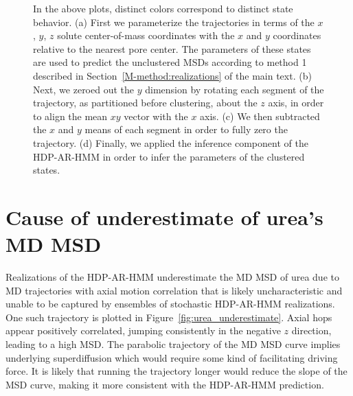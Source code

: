 \documentclass{article}
\begin{document}
\begin{figure}
\begin{subfigure}{0.6\textwidth}
		\caption{}\label{fig:zeroed_clustered_hmm}
	\end{subfigure}  
	\caption{In the above plots, distinct colors correspond to distinct state behavior. 
	(a) First we parameterize the trajectories in terms of the $x$, $y$, $z$ solute 
	center-of-mass coordinates with the $x$ and $y$ coordinates relative to the nearest 
	pore center. The parameters of these states are used to predict the unclustered MSDs
	according to method 1 described in Section~\ref{M-method:realizations} of the main
	text. (b) Next, we zeroed out the $y$ dimension by rotating each segment of the 
	trajectory, as partitioned before clustering, about the $z$ axis, in order to align the 
  	mean $xy$ vector with the $x$ axis. (c) We then subtracted the $x$ and $y$ means of
  	each segment in order to fully zero the trajectory. (d) Finally, we applied the 
  	inference component of the HDP-AR-HMM in order to infer the parameters of the 
  	clustered states.
	}\label{fig:hmm_demo}
  \end{figure}
  
  \newpage

  \section{Cause of underestimate of urea's MD MSD}\label{section:urea_underestimate}
  
  Realizations of the HDP-AR-HMM underestimate the MD MSD of urea due to MD
  trajectories with axial motion correlation that is likely uncharacteristic and
  unable to be captured by ensembles of stochastic HDP-AR-HMM realizations. One
  such trajectory is plotted in Figure~\ref{fig:urea_underestimate}. Axial hops 
  appear positively correlated, jumping consistently in the negative $z$ direction, 
  leading to a high MSD. The parabolic trajectory of the MD MSD curve implies
  underlying superdiffusion which would require some kind of facilitating
  driving force. It is likely that running the trajectory longer would reduce
  the slope of the MSD curve, making it more consistent with the HDP-AR-HMM 
  prediction.
  
\end{document}
